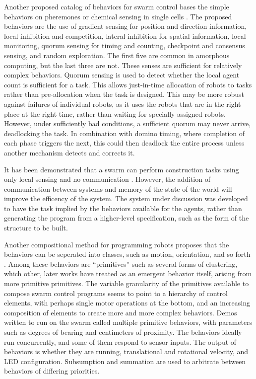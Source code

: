 \documentclass[]{article}
\begin{document}
Another proposed catalog of behaviors for swarm control bases the simple behaviors on pheremones or chemical sensing in single cells \cite{nagpal2004catalog}. 
The proposed behaviors are the use of gradient sensing for position and direction information, local inhibition and competition, lateral inhibition for spatial information, local monitoring, quorum sensing for timing and counting, checkpoint and consensus sensing, and random exploration. 
The first five are common in amorphous computing, but the last three are not. %
These senses are sufficient for relatively complex behaviors. 
Quorum sensing is used to detect whether the local agent count is sufficient for a task. 
This allows just-in-time allocation of robots to tasks rather than pre-allocation when the task is designed. 
This may be more robust against failures of individual robots, as it uses the robots that are in the right place at the right time, rather than waiting for specially assigned robots. 
However, under sufficiently bad conditions, a sufficient quorum may never arrive, deadlocking the task. 
In combination with domino timing, where completion of each phase triggers the next, this could then deadlock the entire process unless another mechanism detects and corrects it.

It has been demonstrated that a swarm can perform construction tasks using only local sensing and no communication \cite{wawerla2002collective, bowyer2000automated}.
However, the addition of communication between systems and memory of the state of the world will improve the efficency of the system.
The system under discussion was developed to have the task implied by the behaviors available for the agents, rather than generating the program from a higher-level specification, such as the form of the structure to be built.

Another compositional method for programming robots proposes that the behaviors can be seperated into classes, such as motion, orientation, and so forth \cite{mclurkin2004stupid}. 
Among these behaviors are ``primitives'' such as several forms of clustering, which other, later works have treated as an emergent behavior itself, arising from more primitive primitives. 
The variable granularity of the primitives available to compose swarm control programs seems to point to a hierarchy of control elements, with perhaps single motor operations at the bottom, and an increasing composition of elements to create more and more complex behaviors.
Demos written to run on the swarm called multiple primitive behaviors, with parameters such as degrees of bearing and centimeters of proximity. 
The behaviors ideally run concurrently, and some of them respond to sensor inputs. 
The output of behaviors is whether they are running, translational and rotational velocity, and LED configuration. 
Subsumption and summation are used to arbitrate between behaviors of differing priorities. 
\end{document}
